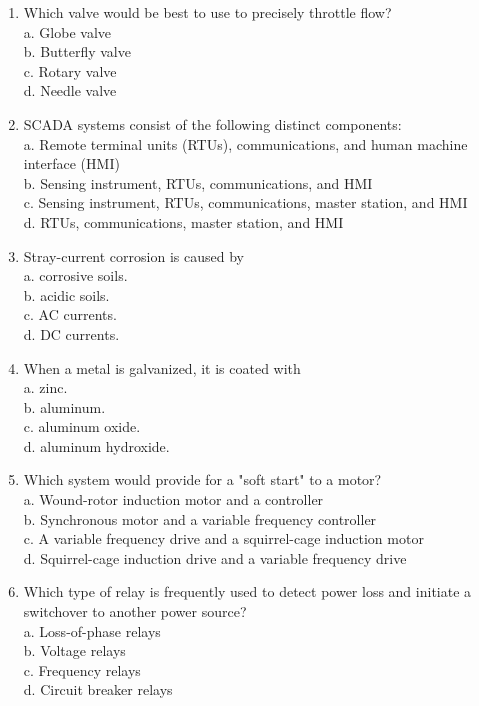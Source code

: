 \documentclass[10pt]{article}
\begin{document}
\begin{enumerate}
  \item Which valve would be best to use to precisely throttle flow?\\
a. Globe valve\\
b. Butterfly valve\\
c. Rotary valve\\
d. Needle valve

  \item SCADA systems consist of the following distinct components:\\
a. Remote terminal units (RTUs), communications, and human machine interface (HMI)\\
b. Sensing instrument, RTUs, communications, and HMI\\
c. Sensing instrument, RTUs, communications, master station, and HMI\\
d. RTUs, communications, master station, and HMI

  \item Stray-current corrosion is caused by\\
a. corrosive soils.\\
b. acidic soils.\\
c. AC currents.\\
d. DC currents.

  \item When a metal is galvanized, it is coated with\\
a. zinc.\\
b. aluminum.\\
c. aluminum oxide.\\
d. aluminum hydroxide.

  \item Which system would provide for a "soft start" to a motor?\\
a. Wound-rotor induction motor and a controller\\
b. Synchronous motor and a variable frequency controller\\
c. A variable frequency drive and a squirrel-cage induction motor\\
d. Squirrel-cage induction drive and a variable frequency drive

  \item Which type of relay is frequently used to detect power loss and initiate a switchover to another power source?\\
a. Loss-of-phase relays\\
b. Voltage relays\\
c. Frequency relays\\
d. Circuit breaker relays


\end{enumerate}
\end{document}
